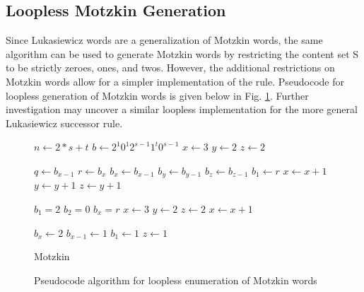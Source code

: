 

\subsection{Loopless Motzkin Generation}
Since Lukasiewicz words are a generalization of Motzkin words, the same algorithm can be used to generate Motzkin words by restricting the content set S to be strictly zeroes, ones, and twos.  However, the additional restrictions on Motzkin words allow for a simpler implementation of the rule.   Pseudocode for loopless generation of Motzkin words is given below in Fig. \ref{motzkinAlg}. Further investigation may uncover a similar loopless implementation for the more general Lukasiewicz successor rule.



\begin{figure}
    \centering
        \begin{algorithm}[H]
        \begin{algorithmic}
        \EndFunction{}
         
        \State $n \gets 2*s+t$
        \State $b \gets 2^1 0^1 2^{s-1} 1^t 0^{s-1}$
        \State $x \gets 3$
        \State $y \gets 2$
        \State $z \gets 2$
        
        \State {}
        
            \State $q \gets b_{x-1}$
            \State $r \gets b_x$
            \vspace{.4em} 
            \State $b_x\gets b_{x-1}$
            \State $b_y\gets b_{y-1}$
            \State $b_z\gets b_{z-1}$
            \State $b_1\gets r$
            \vspace{.4em} 
            \State $x \gets x+1$
            \State $y \gets y+1$
            \State $z \gets y+1$
            
            \vspace{.4em} 
                    \State $b_1=2$
                    \State $b_2=0$
                    \State $b_x=r$
                    \State $x \gets 3$
                    \State $y \gets 2$
                    \State $z \gets 2$
                \Else 
                    \State $x \gets x+1$
                
                \EndIf
                    \State $b_x \gets 2$     
                    \State $b_{x-1} \gets 1$     
                    \State $b_1 \gets 1$     
                    \State $z \gets 1$     
                
            \EndIf
        \EndWhile
        \end{algorithmic}
        \caption{Motzkin}
        \end{algorithm}
    \caption{Pseudocode algorithm for loopless enumeration of Motzkin words}
    \label{motzkinAlg}
\end{figure}
